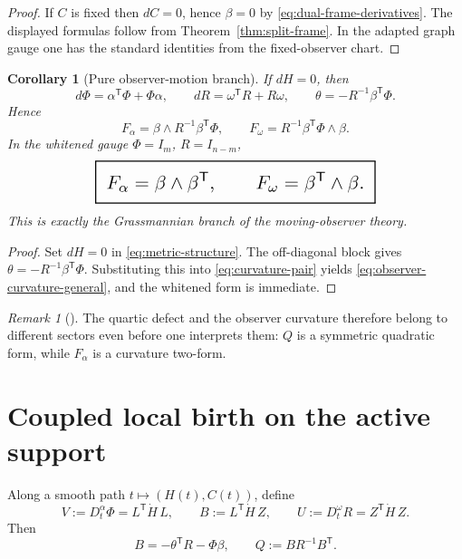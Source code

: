 \documentclass[11pt,a4paper]{article}
\numberwithin{equation}{section}
\newcommand{\geomboxed}[1]{%
  \setlength{\fboxsep}{8pt}%
  \setlength{\fboxrule}{0.9pt}%
  \fbox{\scalebox{1.5}{$\displaystyle #1$}}%
}
\theoremstyle{thmcompact}
\newtheorem{corollary}[theorem]{Corollary}
\theoremstyle{remark}
\newtheorem*{remarkplain}{Remark}
\newenvironment{remark}[1][]%
{\begin{remarkbox}\begin{remarkplain}[#1]\normalfont}
{\end{remarkplain}\end{remarkbox}}
\begin{document}
\begin{proof}
If $C$ is fixed then $dC=0$, hence $\beta=0$ by \eqref{eq:dual-frame-derivatives}. The displayed formulas follow from Theorem~\ref{thm:split-frame}. In the adapted graph gauge one has the standard identities from the fixed-observer chart.
\end{proof}

\begin{corollary}[Pure observer-motion branch]
\label{cor:pure-observer-branch}
If $dH=0$, then
\begin{equation}
d\Phi=\alpha^{\mathsf T}\Phi+\Phi\alpha,
\qquad
dR=\omega^{\mathsf T}R+R\omega,
\qquad
\theta=-R^{-1}\beta^{\mathsf T}\Phi.
\label{eq:pure-observer-branch}
\end{equation}
Hence
\begin{equation}
F_\alpha=\beta\wedge R^{-1}\beta^{\mathsf T}\Phi,
\qquad
F_\omega=R^{-1}\beta^{\mathsf T}\Phi\wedge\beta.
\label{eq:observer-curvature-general}
\end{equation}
In the whitened gauge $\Phi=I_m$, $R=I_{n-m}$,
\begin{equation}
\geomboxed{
F_\alpha=\beta\wedge\beta^{\mathsf T},
\qquad
F_\omega=\beta^{\mathsf T}\wedge\beta.
}
\label{eq:observer-curvature-whitened}
\end{equation}
This is exactly the Grassmannian branch of the moving-observer theory.
\end{corollary}

\begin{proof}
Set $dH=0$ in \eqref{eq:metric-structure}. The off-diagonal block gives $\theta=-R^{-1}\beta^{\mathsf T}\Phi$. Substituting this into \eqref{eq:curvature-pair} yields \eqref{eq:observer-curvature-general}, and the whitened form is immediate.
\end{proof}

\begin{remark}
The quartic defect and the observer curvature therefore belong to different sectors even before one interprets them: $Q$ is a symmetric quadratic form, while $F_\alpha$ is a curvature two-form.
\end{remark}

\section{Coupled local birth on the active support}

Along a smooth path $t\mapsto(H(t),C(t))$, define
\begin{equation}
V:=D_t^\alpha\Phi=L^{\mathsf T}\dot H\,L,
\qquad
B:=L^{\mathsf T}\dot H\,Z,
\qquad
U:=D_t^\omega R=Z^{\mathsf T}\dot H\,Z.
\label{eq:VBU-defs}
\end{equation}
Then
\begin{equation}
B=-\theta^{\mathsf T}R-\Phi\beta,
\qquad
Q:=BR^{-1}B^{\mathsf T}.
\label{eq:BthetaQ}
\end{equation}
\end{document}
